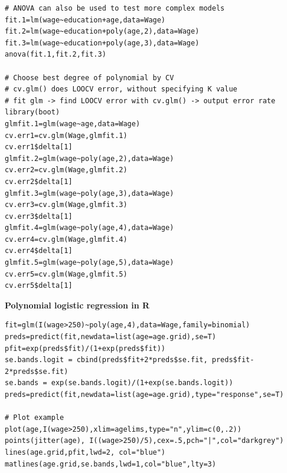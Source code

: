 \documentclass[11pt]{article}
\begin{document}
\begin{lstlisting}
# ANOVA can also be used to test more complex models
fit.1=lm(wage~education+age,data=Wage)
fit.2=lm(wage~education+poly(age,2),data=Wage)
fit.3=lm(wage~education+poly(age,3),data=Wage)
anova(fit.1,fit.2,fit.3)

# Choose best degree of polynomial by CV
# cv.glm() does LOOCV error, without specifying K value 
# fit glm -> find LOOCV error with cv.glm() -> output error rate
library(boot)
glmfit.1=glm(wage~age,data=Wage)
cv.err1=cv.glm(Wage,glmfit.1)
cv.err1$delta[1]
glmfit.2=glm(wage~poly(age,2),data=Wage)
cv.err2=cv.glm(Wage,glmfit.2)
cv.err2$delta[1]
glmfit.3=glm(wage~poly(age,3),data=Wage)
cv.err3=cv.glm(Wage,glmfit.3)
cv.err3$delta[1]
glmfit.4=glm(wage~poly(age,4),data=Wage)
cv.err4=cv.glm(Wage,glmfit.4)
cv.err4$delta[1]
glmfit.5=glm(wage~poly(age,5),data=Wage)
cv.err5=cv.glm(Wage,glmfit.5)
cv.err5$delta[1]
\end{lstlisting}

\noindent \textbf{Polynomial logistic regression in R}
\begin{lstlisting}
fit=glm(I(wage>250)~poly(age,4),data=Wage,family=binomial)
preds=predict(fit,newdata=list(age=age.grid),se=T)
pfit=exp(preds$fit)/(1+exp(preds$fit))
se.bands.logit = cbind(preds$fit+2*preds$se.fit, preds$fit-2*preds$se.fit)
se.bands = exp(se.bands.logit)/(1+exp(se.bands.logit))
preds=predict(fit,newdata=list(age=age.grid),type="response",se=T)

# Plot example
plot(age,I(wage>250),xlim=agelims,type="n",ylim=c(0,.2))
points(jitter(age), I((wage>250)/5),cex=.5,pch="|",col="darkgrey")
lines(age.grid,pfit,lwd=2, col="blue")
matlines(age.grid,se.bands,lwd=1,col="blue",lty=3)
\end{lstlisting}
\end{document}
